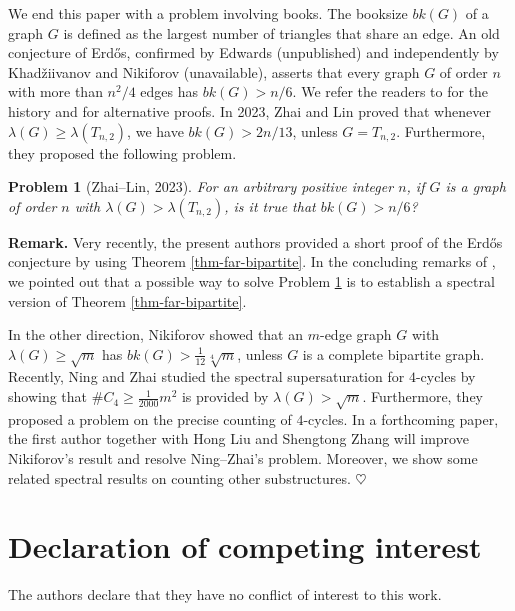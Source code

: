 \documentclass[11pt]{article}
\newtheorem{problem}[theorem]{Problem}
\begin{document}
\medskip 
We end this paper with a problem involving books.  
The booksize $bk(G)$ of a graph $G$ is defined as the largest number of triangles 
that share an edge.  An old conjecture of Erd\H{o}s, 
confirmed by Edwards (unpublished)
and independently by 
Khad\v{z}iivanov and Nikiforov (unavailable), 
asserts that every graph $G$ of order $n$ with more than $n^2/4$ edges 
has $bk(G)> n/6$. 
 We refer the readers to \cite[Lemma 4]{EFR1992} for the history 
 and  \cite{BN2005,LFP2024-triangular} for alternative proofs.   
In 2023, 
Zhai and Lin \cite{ZL2022jgt} proved that whenever $\lambda (G)\ge \lambda (T_{n,2})$, we have $bk(G)> 2n/13$, unless $G=T_{n,2}$. Furthermore, they proposed the following problem. 

\begin{problem}[Zhai--Lin, 2023] \label{prob-ZL}
For an arbitrary positive integer $n$, if $G$ is a graph of order $n$ with $\lambda (G)> \lambda (T_{n,2})$, 
is it true that $bk(G)> {n}/{6}$?  
\end{problem}


\noindent 
{\bf Remark.} 
Very recently, the present authors \cite{LFP2024-triangular} provided a short  proof of the Erd\H{o}s conjecture 
by using Theorem \ref{thm-far-bipartite}. 
In the concluding remarks of \cite{LFP2024-triangular}, 
we pointed out that a possible way to solve Problem \ref{prob-ZL} is to establish 
a spectral version of Theorem \ref{thm-far-bipartite}. 

\medskip 
In the other direction, Nikiforov \cite{Niki2021} 
showed that an $m$-edge graph $G$ with $\lambda (G)\ge \sqrt{m}$ 
has $bk(G)> \frac{1}{12}\sqrt[4]{m}$, unless $G$ is a  complete bipartite graph. 
Recently, Ning and Zhai \cite{NZ2021b} 
studied the spectral supersaturation for $4$-cycles 
by showing that $\# C_4 \ge \frac{1}{2000}m^2$ is provided by $\lambda (G)> \sqrt{m}$. 
Furthermore, they proposed a problem on the precise counting of $4$-cycles.   
In a forthcoming paper, the first author together with Hong Liu and Shengtong Zhang will improve Nikiforov's result and 
resolve Ning--Zhai's problem. Moreover, we 
show some related spectral results 
on counting other substructures. $\heartsuit$  



\iffalse 
\section*{Declaration of competing interest}
The authors declare that they have no conflict of interest to this work.
\end{document}
